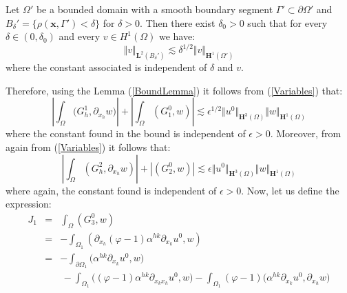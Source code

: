 \begin{lem}
\label{BoundLemma}
Let $\Omega'$ be a bounded domain with a smooth boundary segment $\Gamma' \subset \partial \Omega'$ and $B_{\delta}' = \{ \rho(\mathbf{x}, \Gamma') < \delta \}$ for $\delta > 0$. Then there exist $\delta_0 > 0$ such that for every $\delta \in (0, \delta_0)$ and every $v \in H^1(\Omega)$ we have:
\begin{equation*}
    \Vert v\Vert_{\mathbf{L}^2(B_{\delta}')} \lesssim \delta^{1/2} \Vert v \Vert_{\mathbf{H}^1(\Omega')}
\end{equation*}
where the constant associated is independent of $\delta$ and $v$.
\end{lem}
Therefore, using the Lemma (\ref{BoundLemma}) it follows from (\ref{Variables}) that:
\begin{equation}
    \label{G1Bound}
\left \vert \int_{\Omega} \big( G_h^1, \partial_{x_h} w\big) \right \vert + \left \vert \int_{\Omega} (G_1^0,w) \right \vert \lesssim \epsilon^{1/2} \Vert u^0 \Vert_{\mathbf{H}^3(\Omega)} \Vert w \Vert_{\mathbf{H}^1(\Omega)} 
\end{equation}
where the constant found in the bound is independent of $\epsilon > 0$.
Moreover, from again from (\ref{Variables}) it follows that:
\begin{equation}
    \label{G2Bound}
    \left \vert \int_{\Omega} (G^2_h, \partial_{x_h} w) \right \vert + \left \vert (G^0_2,w) \right \vert \lesssim \epsilon \Vert u^0 \Vert_{\mathbf{H}^3(\Omega)} \Vert w \Vert_{\mathbf{H}^1(\Omega)}
\end{equation}
where again, the constant found is independent of $\epsilon > 0$.
Now, let us define the expression:
\begin{equation}
    \label{J1Expression}
    \begin{array}{ccc}
        J_1 & = &\int_{\Omega} (G_3^0,w)\\ %
        & = &-\int_{\Omega_1} (\partial_{x_h}(\varphi - 1) \alpha^{hk} \partial_{x_k}u^0,w) \\ %
        & = &-\int_{\partial \Omega_1} \big( \alpha^{hk} \partial_{x_k} u^0,w\big) \\%
        & &\, - \int_{\Omega_1} \big( (\varphi -1) \alpha^{hk} \partial_{x_k x_h} u^0,w\big) - \int_{\Omega_1} (\varphi -1) \big( \alpha^{hk} \partial_{x_k} u^0, \partial_{x_h}w \big)
    \end{array}
\end{equation}
